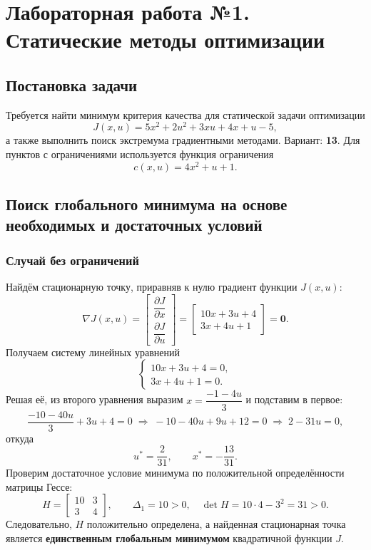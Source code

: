 \chapter{Лабораторная работа №1. Статические методы оптимизации}

\section*{Постановка задачи}
Требуется найти минимум критерия качества для статической задачи оптимизации
\[
J(x,u)=5x^2+2u^2+3xu+4x+u-5,
\]
а также выполнить поиск экстремума градиентными методами. Вариант: \textbf{13}. Для пунктов с ограничениями используется функция ограничения
\[
 c(x,u)=4x^2+u+1.
\]

\section{Поиск глобального минимума на основе необходимых и достаточных условий}
\subsection{Случай без ограничений}
Найдём стационарную точку, приравняв к нулю градиент функции \(J(x,u)\):
\[
\nabla J(x,u)=\begin{bmatrix}
\dfrac{\partial J}{\partial x}\\[1mm]
\dfrac{\partial J}{\partial u}
\end{bmatrix}
=\begin{bmatrix}
10x+3u+4\\
3x+4u+1
\end{bmatrix}=\mathbf{0}.
\]
Получаем систему линейных уравнений
\[
\begin{cases}
10x+3u+4=0,\\
3x+4u+1=0.
\end{cases}
\]
Решая её, из второго уравнения выразим \(x=\dfrac{-1-4u}{3}\) и подставим в первое:
\[
\frac{-10-40u}{3}+3u+4=0 \;\Rightarrow\; -10-40u+9u+12=0 \;\Rightarrow\; 2-31u=0,
\]
откуда
\[
 u^{\ast}=\frac{2}{31},\qquad x^{\ast}=-\frac{13}{31}.
\]
Проверим достаточное условие минимума по положительной определённости матрицы Гессе:
\[
H=\begin{bmatrix}10&3\\3&4\end{bmatrix},\qquad \Delta_1=10>0,\quad \det H=10\cdot4-3^2=31>0.
\]
Следовательно, \(H\) положительно определена, а найденная стационарная точка является \textbf{единственным глобальным минимумом} квадратичной функции \(J\).

